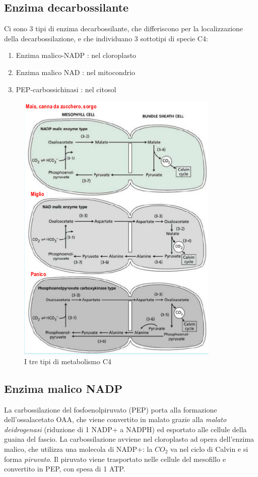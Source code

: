 \documentclass[a4paper,12pt]{book}
\begin{document}
\subsection{Enzima decarbossilante}
Ci sono 3 tipi di enzima decarbossilante, che differiscono per la localizzazione della decarbossilazione, e che individuano 3 sottotipi di specie C4:
\begin{enumerate}
\item{  Enzima malico-NADP : nel  cloroplasto}
\item{Enzima malico NAD : nel mitocondrio}
\item{PEP-carbossichinasi : nel citosol}
\end{enumerate}
\begin{figure}[H]
\centering
\includegraphics[scale=.4]{immagini/metabolismo.jpg}
\caption{I tre tipi di metabolismo C4}
\end{figure} 

\subsection{Enzima malico NADP} 
La carbossilazione del fosfoenolpiruvato (PEP) porta alla formazione dell'ossalacetato OAA, che viene convertito in malato grazie alla \emph{malato deidrogenasi} (riduzione di 1 NADP+ a NADPH) ed esportato alle cellule della guaina del fascio. La carbossilazione avviene nel cloroplasto ad opera dell'enzima malico, che utilizza una molecola di NADP+: la $CO_{2}$ va nel ciclo di Calvin e si forma \emph{piruvato}. Il piruvato viene trasportato nelle cellule del mesofillo e convertito in PEP, con spesa di 1 ATP.
\end{document}
